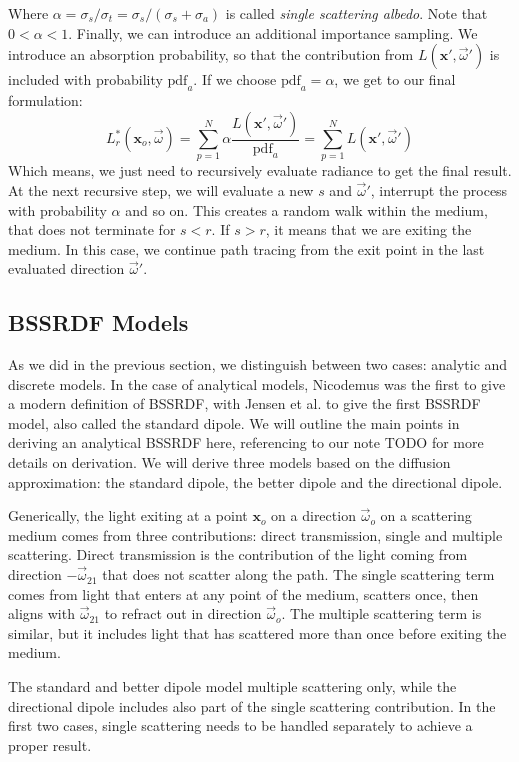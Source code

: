 Where $\alpha = \sigma_s / \sigma_t = \sigma_s / (\sigma_s + \sigma_a)  $ is called \emph{single scattering albedo}. Note that $0 < \alpha < 1$.  Finally, we can introduce an additional importance sampling. We introduce an absorption probability, so that the contribution from $L(\mathbf{x}', \vec{\omega}')$ is included with probability $\text{pdf}_a$. If we choose $\text{pdf}_a = \alpha$, we get to our final formulation:
$$
L_r^*(\mathbf{x}_o, \vec{\omega}) = \sum_{p=1}^N \alpha \frac{L(\mathbf{x}', \vec{\omega}')} {\text{pdf}_a} = \sum_{p=1}^N  L(\mathbf{x}', \vec{\omega}') 
$$
Which means, we just need to recursively evaluate radiance to get the final result. At the next recursive step, we will evaluate a new $s$ and $\vec{\omega}'$, interrupt the process with probability $\alpha$ and so on. This creates a random walk within the medium, that does not terminate for $s < r$. If $s > r$, it means that we are exiting the medium. In this case, we continue path tracing from the exit point in the last evaluated direction $\vec{\omega}'$.

\subsection{BSSRDF Models}
As we did in the previous section, we distinguish between two cases: analytic and discrete models. In the case of analytical models, Nicodemus was the first to give a modern definition of BSSRDF, with Jensen et al. to give the first BSSRDF model, also called the standard dipole. We will outline the main points in deriving an analytical BSSRDF here, referencing to our note TODO for more details on derivation. We will derive three models based on the diffusion approximation: the standard dipole, the better dipole and the directional dipole.

Generically, the light exiting at a point $\mathbf{x}_o$ on a direction $\vec{\omega}_o$ on a scattering medium comes from three contributions: direct transmission, single and multiple scattering. Direct transmission is the contribution of the light coming from direction $-\vec{\omega}_{21}$ that does not scatter along the path. The single scattering term comes from light that enters at any point of the medium, scatters once, then aligns with $\vec{\omega}_{21}$ to refract out in direction $\vec{\omega}_o$. The multiple scattering term is similar, but it includes light that has scattered more than once before exiting the medium. 

The standard and better dipole model multiple scattering only, while the directional dipole includes also part of the single scattering contribution. In the first two cases, single scattering needs to be handled separately to achieve a proper result. 

